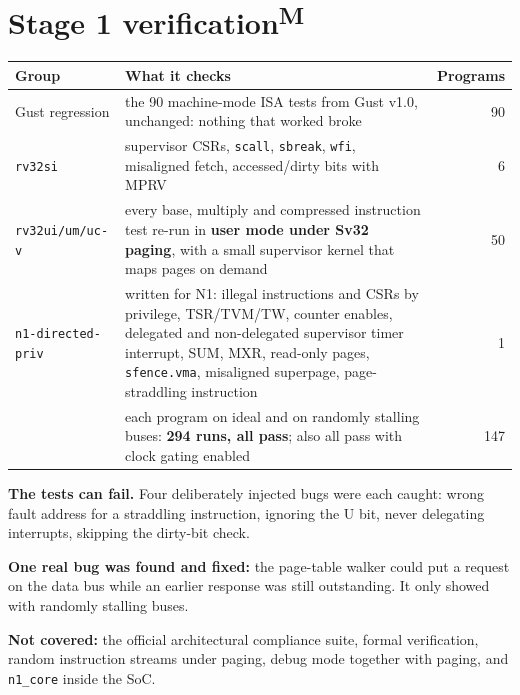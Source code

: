 \documentclass[10pt,a4paper]{article}
\newcommand{\code}[1]{\texttt{#1}}
\newcommand{\meas}{\textsuperscript{M}}
\begin{document}
\section{Stage 1 verification\meas}
\begin{center}\small\begin{tabularx}{\linewidth}{@{}lXr@{}}\toprule
Group & What it checks & Programs \\\midrule
Gust regression & the 90 machine-mode ISA tests from Gust v1.0, unchanged: nothing that worked broke & 90 \\
\code{rv32si} & supervisor CSRs, \code{scall}, \code{sbreak}, \code{wfi}, misaligned fetch, accessed/dirty bits with MPRV & 6 \\
\code{rv32ui/um/uc-v} & every base, multiply and compressed instruction test re-run in \textbf{user mode under Sv32 paging}, with a small supervisor kernel that maps pages on demand & 50 \\
\code{n1-directed-priv} & written for N1: illegal instructions and CSRs by privilege, TSR/TVM/TW, counter enables, delegated and non-delegated supervisor timer interrupt, SUM, MXR, read-only pages, \code{sfence.vma}, misaligned superpage, page-straddling instruction & 1 \\\midrule
& each program on ideal and on randomly stalling buses: \textbf{294 runs, all pass}; also all pass with clock gating enabled & 147 \\\bottomrule
\end{tabularx}\end{center}
\textbf{The tests can fail.} Four deliberately injected bugs were each caught: wrong fault address for a straddling instruction, ignoring the U bit, never delegating interrupts, skipping the dirty-bit check.

\textbf{One real bug was found and fixed:} the page-table walker could put a request on the data bus while an earlier response was still outstanding. It only showed with randomly stalling buses.

\textbf{Not covered:} the official architectural compliance suite, formal verification, random instruction streams under paging, debug mode together with paging, and \code{n1\_core} inside the SoC.
\end{document}
